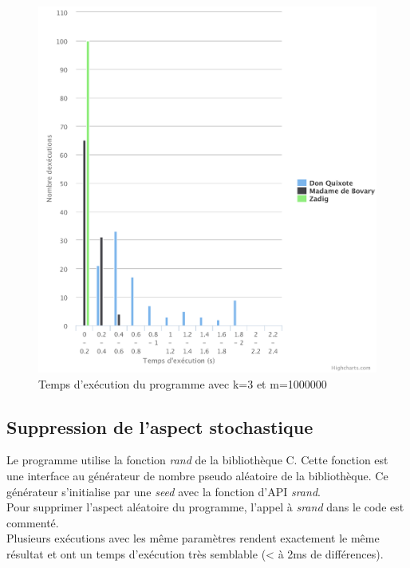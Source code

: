 \documentclass[10pt, a4paper]{article}
\begin{document}
\begin{figure}[ht]
    \centering
    \includegraphics[width=1.0\textwidth]{chart_k3_m1000000}
    \caption{Temps d'exécution du programme avec k=3 et m=1000000}
    \label{fig:chart_k3_m1000000}
\end{figure}

\subsection{Suppression de l'aspect stochastique}

Le programme utilise la fonction \emph{rand} de la bibliothèque C. Cette
fonction est une interface au générateur de nombre pseudo aléatoire de la
bibliothèque. Ce générateur s'initialise par une \emph{seed} avec la fonction
d'API \emph{srand}. \\

Pour supprimer l'aspect aléatoire du programme, l'appel à \emph{srand} dans le
code est commenté. \\

Plusieurs exécutions avec les même paramètres rendent exactement le même
résultat et ont un temps d'exécution très semblable (< à 2ms de différences). \\
\end{document}
